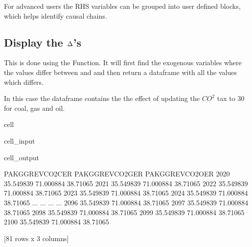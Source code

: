 \documentclass[letterpaper,10pt,english]{jupyterBook}
\begin{document}
\sphinxAtStartPar
For advanced users the RHS variables can be grouped into user defined blocks, which helps identify causal chains.


\subsection{Display the \protect\(\Delta\protect\)’s}
\label{\detokenize{content/06_ModelAnalytics/Attribution:display-the-delta-s}}
\sphinxAtStartPar
This is done using the Function. It will first find the exogenous variables where the values differ between
and  and then return a dataframe with all the values which differs.

\sphinxAtStartPar
In this case the dataframe contains the the effect of updating the \(CO^2\) tax to 30 for coal, gas and oil.

\begin{sphinxuseclass}{cell}\begin{sphinxVerbatimInput}

\begin{sphinxuseclass}{cell_input}
\begin{sphinxVerbatim}[commandchars=\\\{\}]
\end{sphinxVerbatim}

\end{sphinxuseclass}\end{sphinxVerbatimInput}
\begin{sphinxVerbatimOutput}

\begin{sphinxuseclass}{cell_output}
\begin{sphinxVerbatim}[commandchars=\\\{\}]
      PAKGGREVCO2CER  PAKGGREVCO2GER  PAKGGREVCO2OER
2020       35.549839       71.000884        38.71065
2021       35.549839       71.000884        38.71065
2022       35.549839       71.000884        38.71065
2023       35.549839       71.000884        38.71065
2024       35.549839       71.000884        38.71065
...              ...             ...             ...
2096       35.549839       71.000884        38.71065
2097       35.549839       71.000884        38.71065
2098       35.549839       71.000884        38.71065
2099       35.549839       71.000884        38.71065
2100       35.549839       71.000884        38.71065

[81 rows x 3 columns]
\end{sphinxVerbatim}

\end{sphinxuseclass}\end{sphinxVerbatimOutput}

\end{sphinxuseclass}
\end{document}
